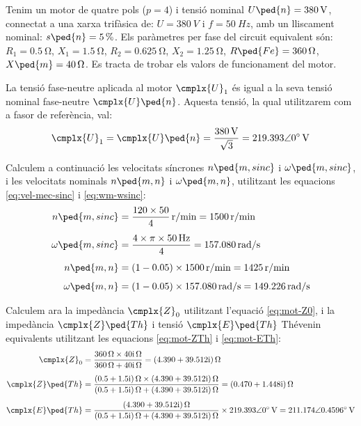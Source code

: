 \begin{exemple}\label{ex:CaractMotor}
	\addcontentsxms{\CaractMotor}	
    Tenim un motor de quatre pols ($p=4$) i tensió nominal $U\ped{n}=\qty{380}{V}$, connectat a una xarxa trifàsica de: $U=\qty{380}{V}$ i $f=\qty{50}{Hz}$, amb un lliscament nominal: $s\ped{n}=\qty{5}{\percent}$. Els paràmetres per fase del circuit equivalent són: $R_1=\qty{0,5}{\ohm}$, $X_1=\qty{1,5}{\ohm}$, $R_2=\qty{0,625}{\ohm}$, $X_2=\qty{1,25}{\ohm}$, $R\ped{Fe}=\qty{360}{\ohm}$, $X\ped{m}=\qty{40}{\ohm}$. Es tracta de trobar els valors de funcionament del motor.

    La tensió fase-neutre aplicada al motor $\cmplx{U}_1$ és igual a la seva tensió nominal  fase-neutre  $\cmplx{U}\ped{n}$. Aquesta tensió, la qual utilitzarem com a fasor de referència, val:
    \[
        \cmplx{U}_1 = \cmplx{U}\ped{n} = \frac{\qty{380}{V}}{\sqrt{3}} = \complexqty{219,393:0}{V}
    \]

    Calculem a continuació les velocitats síncrones $n\ped{m,sinc}$ i $\omega\ped{m,sinc}$, i les velocitats nominals $n\ped{m,n}$ i $\omega\ped{m,n}$, utilitzant les equacions \eqref{eq:vel-mec-sinc} i \eqref{eq:wm-wsinc}:
    \begin{align*}
        n\ped{m,sinc} &= \frac{120\times 50}{4} \, \unit{r/min} = \qty{1500}{r/min} \\[1ex]
        \omega\ped{m,sinc} &= \frac{4 \times\pi \times\qty{50}{Hz}}{4} =  \qty{157,080}{rad/s} \\[1ex]
        n\ped{m,n} &= (1-\num{0,05})\times \qty{1500}{r/min} = \qty{1425}{r/min} \\[1ex]
        \omega\ped{m,n} &= (1-\num{0,05}) \times\qty{157,080}{rad/s} = \qty{149,226}{rad/s}
    \end{align*}

    Calculem ara la impedància $\cmplx{Z}_0$ utilitzant l'equació \eqref{eq:mot-Z0}, i la impedància $\cmplx{Z}\ped{Th}$ i tensió $\cmplx{E}\ped{Th}$ Thévenin equivalents utilitzant les equacions \eqref{eq:mot-ZTh} i \eqref{eq:mot-ETh}:
     \begin{align*}
        \cmplx{Z}_0 &= \frac{\qty{360}{\ohm}\times\complexqty{j40}{\ohm}}{\qty{360}{\ohm}+\complexqty{j40}{\ohm}} = \complexqty{4,390+j39,512}{\ohm} \\[1ex]
        \cmplx{Z}\ped{Th} &= \frac{\complexqty{0,5+j1,5}{\ohm}\times\complexqty{4,390+j39,512}{\ohm}}
        {\complexqty{0,5+j1,5}{\ohm}+\complexqty{4,390+j39,512}{\ohm}} =  \complexqty{0,470+j1,448}{\ohm} \\[1ex]
        \cmplx{E}\ped{Th}  &= \frac{\complexqty{4,390+j39,512}{\ohm}}
        {\complexqty{0,5+j1,5}{\ohm}+\complexqty{4,390+j39,512}{\ohm}}\times\complexqty{219,393:0}{V} =  \complexqty{211,174:0,4596}{V}
    \end{align*}


\end{exemple}

